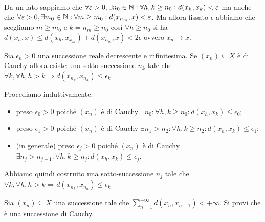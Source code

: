 \documentclass[a4paper]{article}\par \usepackage{style}\par
\begin{document}
Da un lato sappiamo che $ \forall \varepsilon > 0, \exists n_0 \in \mathbb{N} : \forall h, k \geq n_0 : d(x_h, x_k) < \varepsilon $ ma anche che $ \forall \varepsilon > 0, \exists m_0 \in \mathbb{N} : \forall m \geq m_0 : d(x_{n_m}, x) < \varepsilon $. Ma allora fissato $ \epsilon $ abbiamo che scegliamo $ m \geq m_0 $ e $ k = n_m \geq n_0 $ così $ \forall h \geq n_0 $ si ha $ d(x_h, x) \leq d(x_h, x_{x_m}) + d(x_{n_m}, x) < 2\epsilon $ ovvero $ x_n \to x $.\par \begin{es}
  Sia $ \epsilon_n > 0 $ una successione reale decrescente e infinitesima. Se $ (x_n) \subseteq X $ è di Cauchy allora esiste una sotto-successione $ n_k $ tale che $ \forall k, \forall h, h > k \Rightarrow d(x_{n_k}, x_{n_h}) \leq \epsilon_k $
\end{es}\par Procediamo induttivamente:
\begin{itemize}
\item preso $ \epsilon_0 > 0 $ poiché $ (x_n) $ è di Cauchy $ \exists n_0 : \forall h, k \geq n_0 : d(x_h, x_k) \leq \epsilon_0 $;
\item preso $ \epsilon_1 > 0 $ poiché $ (x_n) $ è di Cauchy $ \exists n_1 > n_2 : \forall h, k \geq n_2 : d(x_h, x_k) \leq \epsilon_1 $;
\item (in generale) preso $ \epsilon_j > 0 $ poiché $ (x_n) $ è di Cauchy $ \exists n_{j} > n_{j - 1} : \forall h, k \geq n_{j} : d(x_h, x_k) \leq \epsilon_j $.
\end{itemize}
Abbiamo quindi costruito una sotto-successione $ n_j $ tale che $ \forall k, \forall h, h > k \Rightarrow d(x_{n_k}, x_{n_h}) \leq \epsilon_k $\par \begin{es}
  Sia $ (x_n) \subseteq X $ una successione tale che $ \sum_{n = 1}^{+\infty} d(x_n, x_{n + 1}) < +\infty $. Si provi che è una successione di Cauchy.
\end{es}
\end{document}
